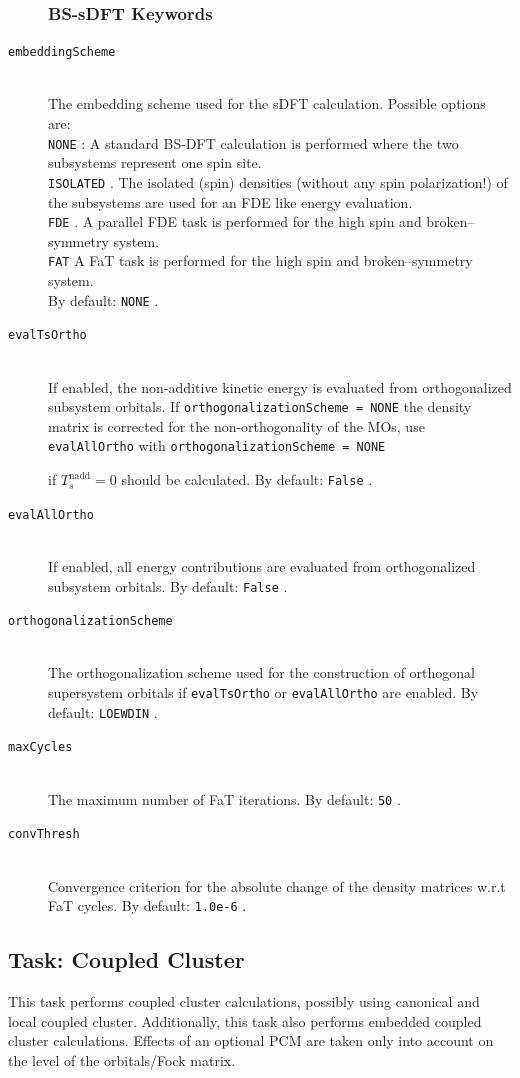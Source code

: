 \documentclass[bibliography=totocnumbered,a4paper,10pt,oneside]{scrbook}
\newcommand{\ttt}[1]{%
  \begingroup\setlength{\fboxsep}{1pt}%
  \colorbox{serenity-green!30}{\texttt{\hspace*{2pt}\vphantom{(g}#1\hspace*{2pt}}}%
  \endgroup
}
\begin{document}
\begin{description}
\subsubsection{BS-sDFT Keywords}
	\item [\texttt{embeddingScheme}]\hfill \\
	The embedding scheme used for the sDFT calculation. Possible options are: \\
    \ttt{NONE}: A standard BS-DFT calculation is performed where the two subsystems 
    represent one spin site.\\
	\ttt{ISOLATED}. The isolated (spin) densities (without any spin polarization!) of the 
	subsystems are used for an FDE like energy evaluation.\\ 
	\ttt{FDE}. A parallel FDE task is performed for the high spin and broken--symmetry
	system.\\ 
	\ttt{FAT} A FaT task is performed for the high spin and broken--symmetry
	system.\\
	By default: \ttt{NONE}.
	\item [\texttt{evalTsOrtho}]\hfill \\
	If enabled, the non-additive kinetic energy is evaluated from orthogonalized subsystem 
	orbitals. If \ttt{orthogonalizationScheme = NONE} the density matrix is corrected for
	the non-orthogonality of the MOs, use \ttt{evalAllOrtho} with \ttt{orthogonalizationScheme = NONE} 
	if $T_s^\text{nadd}=0$ should be calculated. By default: \ttt{False}.
	\item [\texttt{evalAllOrtho}]\hfill \\
	If enabled, all energy contributions are evaluated from orthogonalized subsystem orbitals.
	By default: \ttt{False}.
	\item [\texttt{orthogonalizationScheme}]\hfill \\ The orthogonalization scheme used
	for the construction of orthogonal supersystem orbitals if \ttt{evalTsOrtho} or \ttt{evalAllOrtho} are enabled.
	By default: \ttt{LOEWDIN}.
	\item [\texttt{maxCycles}]\hfill \\ The maximum number of FaT iterations.
	By default: \ttt{50}.
	\item [\texttt{convThresh}]\hfill \\ Convergence criterion for the absolute change
	of the density matrices w.r.t FaT cycles.
	By default: \ttt{1.0e-6}.
\end{description}

\subsection{Task: Coupled Cluster\label{sec:coupledClusterTask}}
This task performs coupled cluster calculations, possibly using canonical and local coupled cluster.
Additionally, this task also performs embedded coupled cluster calculations. Effects of an optional
PCM are taken only into account on the level of the orbitals/Fock matrix.
\end{document}

